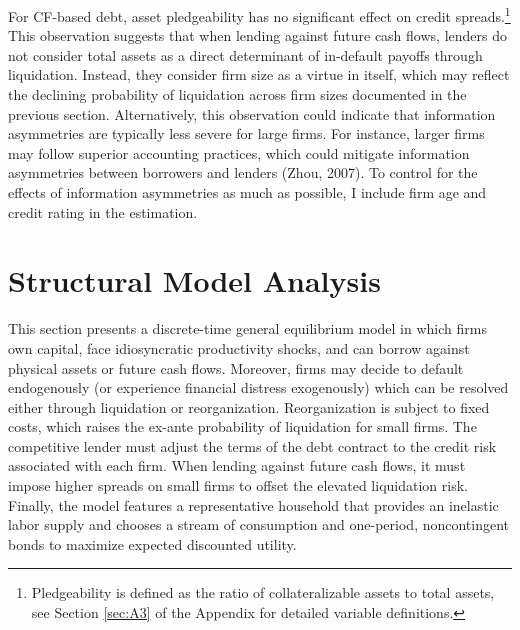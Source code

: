 \documentclass[12pt]{article}
\begin{document}
For CF-based debt, asset pledgeability has no significant effect on credit spreads.\footnote{Pledgeability is defined as the ratio of collateralizable assets to total assets, see Section \ref{sec:A3} of the Appendix for detailed variable definitions.}  This observation suggests that when lending against future cash flows, lenders do not consider total assets as a direct determinant of in-default payoffs through liquidation. Instead, they consider firm size as a virtue in itself, which may reflect the declining probability of liquidation across firm sizes documented in the previous section. Alternatively, this observation could indicate that information asymmetries are typically less severe for large firms. For instance, larger firms may follow superior accounting practices, which could mitigate information asymmetries between borrowers and lenders (Zhou, 2007). To control for the effects of information asymmetries as much as possible, I include firm age and credit rating in the estimation.

\section{Structural Model Analysis} \label{sec:model}
This section presents a discrete-time general equilibrium model in which firms own capital, face idiosyncratic productivity shocks, and can borrow against physical assets or future cash flows. Moreover, firms may decide to default endogenously (or experience financial distress exogenously) which can be resolved either through liquidation or reorganization. Reorganization is subject to fixed costs, which raises the ex-ante probability of liquidation for small firms. The competitive lender must adjust the terms of the debt contract to the credit risk associated with each firm. When lending against future cash flows, it must impose higher spreads on small firms to offset the elevated liquidation risk. Finally, the model features a representative household that provides an inelastic labor supply and chooses a stream of consumption and one-period, noncontingent bonds to maximize expected discounted utility.
\end{document}
